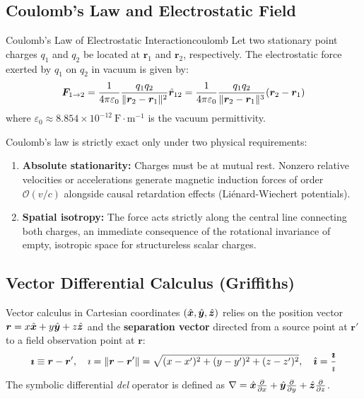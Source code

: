 \subsection{Coulomb's Law and Electrostatic Field}

\begin{theorem}{Coulomb's Law of Electrostatic Interaction}{coulomb}
Let two stationary point charges $q_1$ and $q_2$ be located at $\bm{r}_1$ and $\bm{r}_2$, respectively. The electrostatic force exerted by $q_1$ on $q_2$ in vacuum is given by:
\begin{equation}
    \bm{F}_{1 \to 2} = \frac{1}{4\pi\varepsilon_0} \frac{q_1 q_2}{\|\bm{r}_2 - \bm{r}_1\|^2} \hat{\bm{r}}_{12} = \frac{1}{4\pi\varepsilon_0} \frac{q_1 q_2}{\|\bm{r}_2 - \bm{r}_1\|^3} (\bm{r}_2 - \bm{r}_1)
\end{equation}
where $\varepsilon_0 \approx 8.854 \times 10^{-12}\ \text{F}\cdot\text{m}^{-1}$ is the vacuum permittivity.
\end{theorem}

\begin{remark}
Coulomb's law is strictly exact only under two physical requirements:
\begin{enumerate}
    \item \textbf{Absolute stationarity:} Charges must be at mutual rest. Nonzero relative velocities or accelerations generate magnetic induction forces of order $\mathcal{O}(v/c)$ alongside causal retardation effects (Liénard-Wiechert potentials).
    \item \textbf{Spatial isotropy:} The force acts strictly along the central line connecting both charges, an immediate consequence of the rotational invariance of empty, isotropic space for structureless scalar charges.
\end{enumerate}
\end{remark}

\subsection{Vector Differential Calculus (Griffiths)}

Vector calculus in Cartesian coordinates $(\hat{\bm{x}}, \hat{\bm{y}}, \hat{\bm{z}})$ relies on the position vector $\bm{r} = x\hat{\bm{x}} + y\hat{\bm{y}} + z\hat{\bm{z}}$ and the \textbf{separation vector} directed from a source point at $\bm{r}'$ to a field observation point at $\bm{r}$:
\begin{equation}
    \bm{\imath} \equiv \bm{r} - \bm{r}', \quad \imath = \|\bm{r} - \bm{r}'\| = \sqrt{(x-x')^2 + (y-y')^2 + (z-z')^2}, \quad \hat{\bm{\imath}} = \frac{\bm{\imath}}{\imath}
\end{equation}
The symbolic differential \textit{del} operator is defined as $\nabla = \hat{\bm{x}}\pdv{x} + \hat{\bm{y}}\pdv{y} + \hat{\bm{z}}\pdv{z}$.


